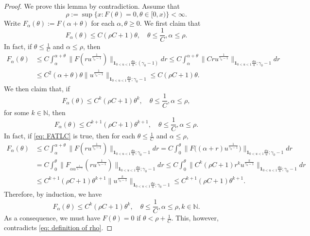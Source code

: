 \documentclass[12pt, a4paper]{amsart}
\theoremstyle{definition}
\numberwithin{equation}{section}
\begin{document}
\begin{proof}
    We prove this lemma by contradiction.
	Assume that
\[\label{eq: definition of rho}
	\rho :=  \sup\{x: F(\theta) = 0, \theta \in [0,x)\} < \infty.
\]
	Write $F_\alpha (\theta) := F(\alpha + \theta)$ for each $\alpha, \theta \geq 0$.
	We first claim that
\[
	F_\alpha (\theta)
	\leq C(\rho C + 1) \theta,
	\quad \theta \leq \frac{1}{C}, \alpha \leq \rho.
\]
	In fact, if $\theta \leq \frac{1}{C}$ and $\alpha \leq \rho$, then
\[\begin{split}
	F_\alpha (\theta)
	&\leq C\int_\alpha^{\alpha + \theta} \|F(ru^{\frac{1}{\gamma_0 - 1}}) \|_{\mathbf 1_{0<u<1}\frac{du}{u}; (\gamma_0 - 1)} dr
	\leq C\int_\alpha^{\alpha + \theta} \|Cru^{\frac{1}{\gamma_0 - 1}} \|_{\mathbf 1_{0<u<1}\frac{du}{u}; \gamma_0 - 1} dr
	\\&\leq C^2 (\alpha + \theta) \theta \|u^{\frac{1}{\gamma_0 - 1}} \|_{\mathbf 1_{0<u<1}\frac{du}{u}; \gamma_0 - 1}
	\leq C(\rho C + 1) \theta.
\end{split}\]
	We then claim that, if
\[\label{eq: FATLC}
	F_\alpha (\theta)
	\leq C^k(\rho C + 1) \theta^k,
	\quad \theta \leq \frac{1}{C}, \alpha \leq \rho,
\]
	for some $k \in \mathbb N$, then
\[
	F_\alpha (\theta)
	\leq C^{k+1}(\rho C + 1) \theta^{k+1},
	\quad \theta \leq \frac{1}{C}, \alpha \leq \rho.
	\]
	In fact, if \eqref{eq: FATLC} is true, then for each $\theta \leq \frac{1}{C}$ and $\alpha \leq \rho$,
\[\begin{split}
	F_\alpha (\theta)
	&\leq C\int_\alpha^{\alpha + \theta} \|F(ru^{\frac{1}{\gamma_0 - 1}}) \|_{\mathbf 1_{0<u<1}\frac{du}{u}; \gamma_0 - 1} dr
	=  C\int_0^\theta \big \|F\big( (\alpha + r)u^{\frac{1}{\gamma_0 - 1}} \big ) \big \|_{\mathbf 1_{0<u<1}\frac{du}{u}; \gamma_0 - 1} dr
	\\& =  C\int_0^\theta \|F_{\alpha u^{\frac{1}{\gamma_0 - 1}}}( ru^{\frac{1}{\gamma_0 - 1}}) \|_{\mathbf 1_{0<u<1}\frac{du}{u}; \gamma_0 - 1} dr
	\leq C\int_0^ \theta \|C^k (\rho C+ 1) r^k u^{\frac{k}{\gamma_0 - 1} } \|_{\mathbf 1_{0<u<1}\frac{du}{u}; \gamma_0 - 1} dr
	\\&\leq C^{k+1} (\rho C + 1) \theta^{k+1} \|u^{\frac{k}{\gamma_0 - 1} } \|_{\mathbf 1_{0<u<1}\frac{du}{u}; \gamma_0 - 1}
	\leq C^{k+1} (\rho C+1) \theta^{k+1} .
\end{split}\]
	Therefore, by induction, we have
\[
	F_\alpha (\theta)
	\leq C^k(\rho C + 1) \theta^k,
	\quad \theta \leq \frac{1}{C}, \alpha \leq \rho, k \in \mathbb N.
\]
	As a consequence, we must have $F(\theta) = 0$ if $\theta < \rho + \frac{1}{C}$.
	This, however, contradicts \eqref{eq: definition of rho}.
\end{proof}
\end{document}
